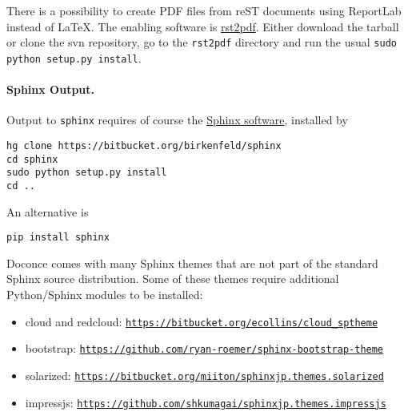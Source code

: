\documentclass[%
oneside,                 %
final,                   %
10pt]{article}
\begin{document}
There is a possibility to create PDF files from reST documents
using ReportLab instead of {\LaTeX}. The enabling software is
\href{{http://code.google.com/p/rst2pdf}}{rst2pdf}. Either download the tarball
or clone the svn repository, go to the {\fontsize{10pt}{10pt}\Verb!rst2pdf!} directory and
run the usual {\fontsize{10pt}{10pt}\Verb!sudo python setup.py install!}.

\paragraph{Sphinx Output.}
Output to {\fontsize{10pt}{10pt}\Verb!sphinx!} requires of course the
\href{{http://sphinx.pocoo.org}}{Sphinx software},
installed by

\vspace{4pt}
\begin{Verbatim}[numbers=none,frame=lines,fontsize=\fontsize{9pt}{9pt},labelposition=topline,framesep=2.5mm,framerule=0.7pt]
hg clone https://bitbucket.org/birkenfeld/sphinx
cd sphinx
sudo python setup.py install
cd ..
\end{Verbatim}
An alternative is

\vspace{4pt}
\begin{Verbatim}[numbers=none,frame=lines,fontsize=\fontsize{9pt}{9pt},labelposition=topline,framesep=2.5mm,framerule=0.7pt]
pip install sphinx
\end{Verbatim}

Doconce comes with many Sphinx themes that are not part of the
standard Sphinx source distribution. Some of these themes require
additional Python/Sphinx modules to be installed:

\begin{itemize}
 \item cloud and redcloud: \href{{https://bitbucket.org/ecollins/cloud_sptheme}}{\nolinkurl{https://bitbucket.org/ecollins/cloud_sptheme}}

 \item bootstrap: \href{{https://github.com/ryan-roemer/sphinx-bootstrap-theme}}{\nolinkurl{https://github.com/ryan-roemer/sphinx-bootstrap-theme}}

 \item solarized: \href{{https://bitbucket.org/miiton/sphinxjp.themes.solarized}}{\nolinkurl{https://bitbucket.org/miiton/sphinxjp.themes.solarized}}

 \item impressjs: \href{{https://github.com/shkumagai/sphinxjp.themes.impressjs}}{\nolinkurl{https://github.com/shkumagai/sphinxjp.themes.impressjs}}
\end{itemize}
\end{document}
